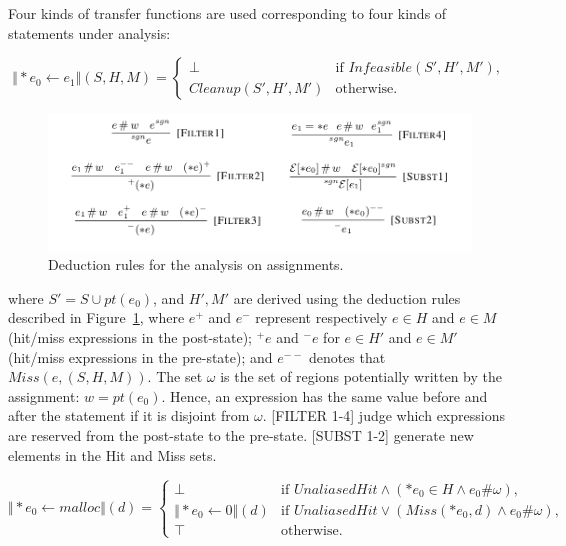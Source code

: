 Four kinds of transfer functions are used corresponding to four kinds of 
statements under analysis:


\[
\Vert *e_0 \gets e_1 \Vert(S,H,M)=\begin{cases}
\bot& \text{if $Infeasible(S',H',M')$},\\
Cleanup(S',H',M')& \text{otherwise}.
\end{cases}
\]


\begin{figure}
  \centering
  \includegraphics[width=1.0\columnwidth]{figs/rules_assignment}
   \caption{Deduction rules for the analysis on assignments.}
   \label{fig:rule_ass}
\end{figure}

where $S'=S\cup pt(e_0)$, and $H',M'$ are derived using the deduction rules 
described in Figure~\ref{fig:rule_ass}, where $e^+$ and $e^-$ represent 
respectively $e\in H$ and $e\in M$ (hit/miss expressions in the post-state); 
$^+e$ and $^-e$ for $e\in H'$ and $e\in M'$ (hit/miss expressions in the 
pre-state); and $e^{--}$ denotes that $Miss(e,(S,H,M))$. The set $\omega$ is 
the set of regions potentially written by the assignment: $w=pt(e_0)$. Hence,
an expression has the same value before and after the statement if it is 
disjoint from $\omega$. 
[FILTER 1-4] judge which expressions are reserved from the post-state to the 
pre-state. [SUBST 1-2] generate new elements in the Hit and Miss sets.



\[
\Vert *e_0 \gets malloc \Vert(d)=\begin{cases}
\bot& \text{if $UnaliasedHit \wedge (*e_0 \in H \wedge e_0\#\omega)$},\\
\Vert *e_0 \gets 0 \Vert (d)& 
  \text{if $UnaliasedHit \vee (Miss(*e_0,d) \wedge e_0\#\omega)$},\\
\top& \text{otherwise}.
\end{cases}
\]

